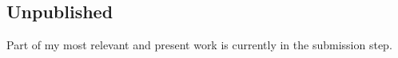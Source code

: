 \newpage

\begin{refsection}
   \section{Unpublished}
   Part of my most relevant and present work is currently in the submission step\parencite{pred}.
\printbibliography[heading=subbibliography]
\end{refsection}

\nocite{*}
\printbibliography[title=Publications]


